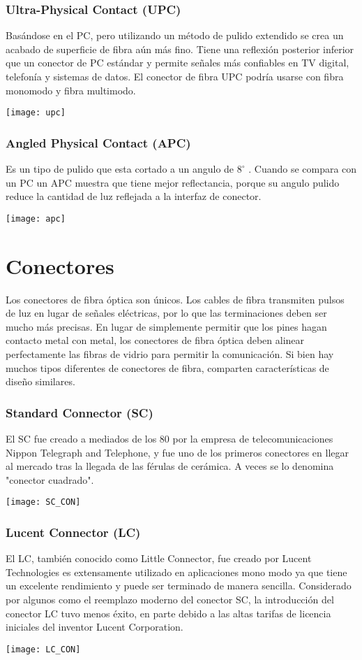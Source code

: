 \subsubsection*{Ultra-Physical Contact (UPC)}
Basándose en el PC, pero utilizando un método de pulido extendido se crea un acabado de superficie de fibra aún más fino. Tiene una reflexión posterior inferior que un conector de PC estándar y permite señales más confiables en TV digital, telefonía y sistemas de datos. El conector de fibra UPC podría usarse con fibra monomodo y fibra multimodo.
\begin{center}
\texttt{[image: upc]}
\end{center}
\subsubsection*{Angled Physical Contact (APC)}
Es un tipo de pulido que esta cortado a un angulo de $8^{\circ}$ . Cuando se compara con un PC un APC muestra que tiene mejor reflectancia, porque su angulo pulido reduce la cantidad de luz reflejada a la interfaz de conector.
\begin{center}
\texttt{[image: apc]}
\end{center}
\section{Conectores}
Los conectores de fibra óptica son únicos. Los cables de fibra transmiten pulsos de luz en lugar de señales eléctricas, por lo que las terminaciones deben ser mucho más precisas. En lugar de simplemente permitir que los pines hagan contacto metal con metal, los conectores de fibra óptica deben alinear perfectamente las fibras de vidrio para permitir la comunicación. Si bien hay muchos tipos diferentes de conectores de fibra, comparten características de diseño similares.
\subsubsection*{Standard Connector (SC)}
El SC fue creado a mediados de los 80 por la empresa de telecomunicaciones Nippon Telegraph and Telephone, y fue uno de los primeros conectores en llegar al mercado tras la llegada de las férulas de cerámica. A veces se lo denomina "conector cuadrado".
\begin{center}
\texttt{[image: SC\_CON]}
\end{center}
\subsubsection*{Lucent Connector (LC)}
El LC, también conocido como Little Connector, fue creado por Lucent Technologies es extensamente utilizado en aplicaciones mono modo ya que tiene un excelente rendimiento y puede ser terminado de manera sencilla. Considerado por algunos como el reemplazo moderno del conector SC, la introducción del conector LC tuvo menos éxito, en parte debido a las altas tarifas de licencia iniciales del inventor Lucent Corporation.
\begin{center}
\texttt{[image: LC\_CON]}
\end{center}
